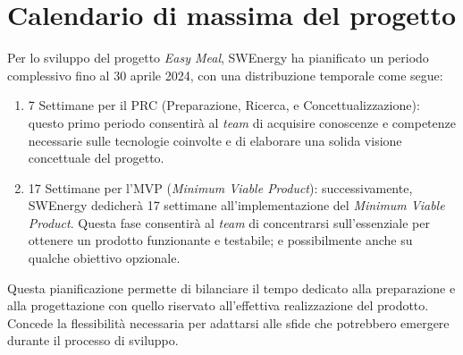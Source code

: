 \section{Calendario di massima del progetto}

Per lo sviluppo del progetto \textit{Easy Meal}, SWEnergy ha 
pianificato un periodo complessivo fino al 30 aprile 2024, con una distribuzione 
temporale come segue:
\begin{enumerate}
	\item 7 Settimane per il PRC (Preparazione, Ricerca, e Concettualizzazione): 
	questo primo periodo consentirà al \textit{team} di acquisire conoscenze e 
	competenze necessarie sulle tecnologie coinvolte e di elaborare una solida 
	visione concettuale del progetto.

	\item 17 Settimane per l'MVP (\textit{Minimum Viable Product}): 
	successivamente, SWEnergy dedicherà 17 settimane all'implementazione del
	\textit{Minimum Viable Product}. Questa fase consentirà al \textit{team} di 
	concentrarsi sull'essenziale per ottenere un prodotto funzionante e 
	testabile; e possibilmente anche su qualche obiettivo opzionale.
\end{enumerate}

\noindent
Questa pianificazione permette di bilanciare il tempo dedicato alla 
preparazione e alla progettazione con quello riservato all'effettiva 
realizzazione del prodotto. Concede la flessibilità necessaria per adattarsi 
alle sfide che potrebbero emergere durante il processo di sviluppo.
